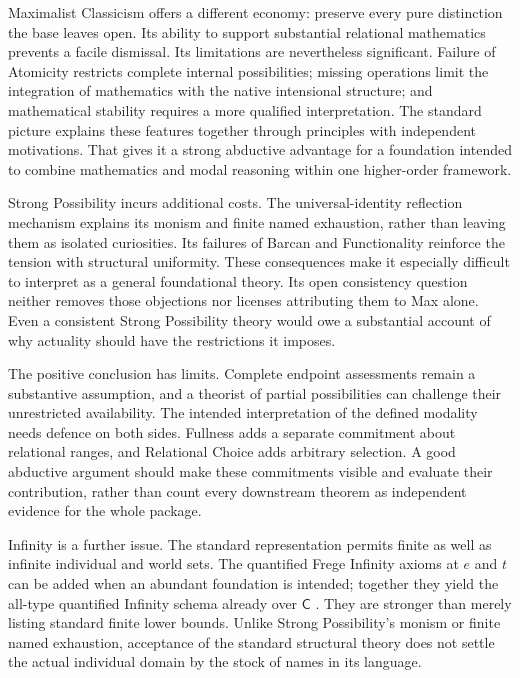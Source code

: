 \documentclass[12pt,letterpaper]{article}
\newcommand{\C}{\mathsf C}
\begin{document}
Maximalist Classicism offers a different economy: preserve every pure distinction the base leaves open. Its ability to support substantial relational mathematics prevents a facile dismissal. Its limitations are nevertheless significant. Failure of Atomicity restricts complete internal possibilities; missing operations limit the integration of mathematics with the native intensional structure; and mathematical stability requires a more qualified interpretation. The standard picture explains these features together through principles with independent motivations. That gives it a strong abductive advantage for a foundation intended to combine mathematics and modal reasoning within one higher-order framework.

Strong Possibility incurs additional costs. The universal-identity reflection mechanism explains its monism and finite named exhaustion, rather than leaving them as isolated curiosities. Its failures of Barcan and Functionality reinforce the tension with structural uniformity. These consequences make it especially difficult to interpret as a general foundational theory. Its open consistency question neither removes those objections nor licenses attributing them to Max alone. Even a consistent Strong Possibility theory would owe a substantial account of why actuality should have the restrictions it imposes.

The positive conclusion has limits. Complete endpoint assessments remain a substantive assumption, and a theorist of partial possibilities can challenge their unrestricted availability. The intended interpretation of the defined modality needs defence on both sides. Fullness adds a separate commitment about relational ranges, and Relational Choice adds arbitrary selection. A good abductive argument should make these commitments visible and evaluate their contribution, rather than count every downstream theorem as independent evidence for the whole package.

Infinity is a further issue. The standard representation permits finite as well as infinite individual and world sets. The quantified Frege Infinity axioms at $e$ and $t$ can be added when an abundant foundation is intended; together they yield the all-type quantified Infinity schema already over $\C$ \citep[\S6]{finiteTypes}. They are stronger than merely listing standard finite lower bounds. Unlike Strong Possibility's monism or finite named exhaustion, acceptance of the standard structural theory does not settle the actual individual domain by the stock of names in its language.
\end{document}
